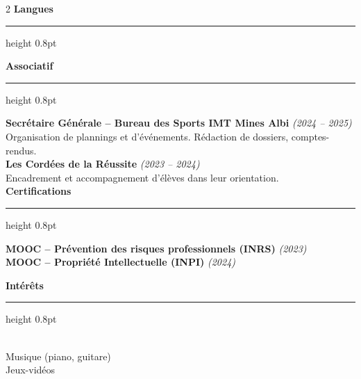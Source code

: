 \documentclass[10.5pt,a4paper]{article}
\newcommand{\subsectitle}[1]{%
  {\color{accent}\bfseries\large #1}\\[-2pt]
  {\color{accent}\hrule height 0.8pt}\vspace{5pt}
}
\newcommand{\sidebardated}[3]{%
  \textbf{\small #1} {\itshape\color{graytext}\footnotesize (#2)}\\
  {\small #3}\\[3pt]
}
\newcommand{\sidebarcert}[2]{%
  \noindent\textbf{\small #1} {\itshape\color{graytext}\footnotesize (#2)}\\[2pt]
}
\begin{document}
\begin{paracol}{2}
\subsectitle{Langues}

\vspace{5pt}

\subsectitle{Associatif}

\sidebardated{Secrétaire Générale -- Bureau des Sports IMT Mines Albi}{2024 -- 2025}{Organisation de plannings et d'événements. Rédaction de dossiers, comptes-rendus.}

\sidebardated{Les Cordées de la Réussite}{2023 -- 2024}{Encadrement et accompagnement d'élèves dans leur orientation.}

\subsectitle{Certifications}

\sidebarcert{MOOC -- Prévention des risques professionnels (INRS)}{2023}
\sidebarcert{MOOC -- Propriété Intellectuelle (INPI)}{2024}

\vspace{4pt}

\subsectitle{Intérêts}
\\
{\small Musique (piano, guitare)}\\
{\small Jeux-vidéos}

\end{paracol}
\end{document}
